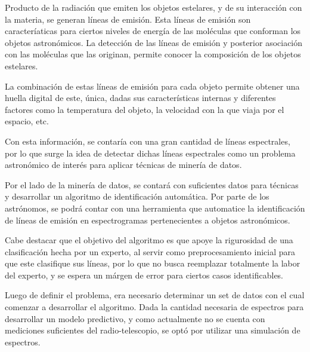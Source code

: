 Producto de la radiación que emiten los objetos estelares, y de su interacción con la materia, se generan líneas de emisión. Esta líneas de emisión son caracteríaticas para ciertos niveles de energía de las moléculas que conforman los objetos astronómicos. La detección de las líneas de emisión y posterior asociación con las moléculas que las originan, permite conocer la composición de los objetos estelares.

La combinación de estas líneas de emisión para cada objeto permite obtener una huella digital de este, única, dadas sus características internas y diferentes factores como la temperatura del objeto, la velocidad con la que viaja por el espacio, etc.

Con esta información, se contaría con una gran cantidad de líneas espectrales, por lo que surge la idea de detectar dichas líneas espectrales como un problema astronómico de interés para aplicar técnicas de minería de datos.

Por el lado de la minería de datos, se contará con suficientes datos para técnicas y desarrollar un algoritmo de identificación automática. Por parte de los astrónomos, se podrá contar con una herramienta que automatice la identificación de líneas de emisión en espectrogramas pertenecientes a objetos astronómicos.

Cabe destacar que el objetivo del algoritmo es que apoye la rigurosidad de una clasificación hecha por un experto, al servir como preprocesamiento inicial para que este clasifique sus líneas, por lo que no busca reemplazar totalmente la labor del experto, y se espera un márgen de error para ciertos casos identificables.

Luego de definir el problema, era necesario determinar un set de datos con el cual comenzar a desarrollar el algoritmo. Dada la cantidad necesaria de espectros para desarrollar un modelo predictivo, y como actualmente no se cuenta con mediciones suficientes del radio-telescopio, se optó por utilizar una simulación de espectros.